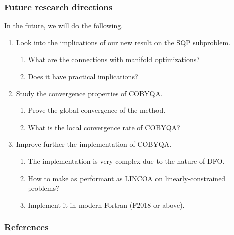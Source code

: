 \documentclass{polyu-presentation}
\begin{document}
\begin{frame}
    \frametitle{Future research directions}

	In the future, we will do the following.
    \begin{enumerate}
        \item Look into the \alert{implications} of our new result on the SQP subproblem.
        \begin{enumerate}
            \item What are the connections with \alert{manifold optimizations}?
            \item Does it have practical implications?
        \end{enumerate}
        \item Study the \alert{convergence properties} of COBYQA.
        \begin{enumerate}
            \item Prove the global convergence of the method.
            \item What is the local convergence rate of COBYQA?
        \end{enumerate}
        \item Improve further the \alert{implementation} of COBYQA.
        \begin{enumerate}
            \item The implementation is very complex due to the nature of DFO.
            \item How to make as performant as LINCOA on linearly-constrained problems?
            \item Implement it in modern Fortran (F2018 or above).
        \end{enumerate}
    \end{enumerate}
\end{frame}

\appendix

\begin{frame}[t,allowframebreaks]
    \frametitle{References}

	\printbibliography
\end{frame}
\end{document}
